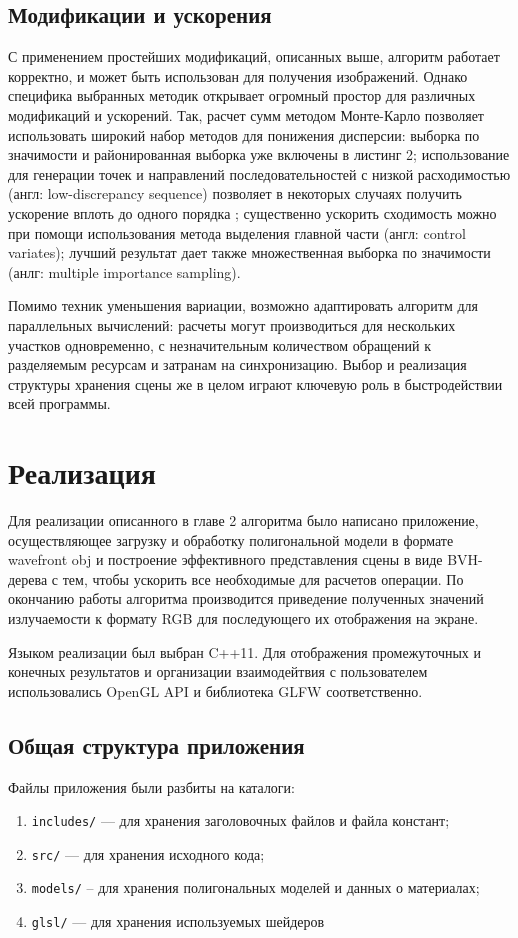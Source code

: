 \documentclass[12pt]{article}
\begin{document}
\subsection{Модификации и ускорения}
С применением простейших модификаций, описанных выше, алгоритм работает корректно, и может быть использован для получения изображений. Однако специфика выбранных методик открывает огромный простор для различных модификаций и ускорений. Так, расчет сумм методом Монте-Карло позволяет использовать широкий набор методов для понижения дисперсии: выборка по значимости и районированная выборка уже включены в листинг 2; использование для генерации точек и направлений последовательностей с низкой расходимостью (англ: low-discrepancy sequence) позволяет в некоторых случаях получить ускорение вплоть до одного порядка \cite{Kel96}; существенно ускорить сходимость можно при помощи использования метода выделения главной части (англ: control variates); лучший результат дает также множественная выборка по значимости (анлг: multiple importance sampling).

Помимо техник уменьшения вариации, возможно адаптировать алгоритм для параллельных вычислений: расчеты могут производиться  для нескольких участков одновременно, с незначительным количеством обращений к разделяемым ресурсам и затранам на синхронизацию. Выбор и реализация структуры хранения сцены же в целом играют ключевую роль в быстродействии всей программы. 
\newpage\section{Реализация}
Для реализации описанного в главе 2 алгоритма было написано приложение, осуществляющее загрузку и обработку полигональной модели в формате wavefront obj и построение эффективного представления сцены в виде BVH-дерева с тем, чтобы ускорить все необходимые для расчетов операции. По окончанию работы алгоритма производится приведение полученных значений излучаемости к формату RGB для последующего их отображения на экране.

Языком реализации был выбран C++11. Для отображения промежуточных и конечных результатов и организации взаимодейтвия с пользователем использовались OpenGL API и библиотека GLFW соответственно.
\subsection{Общая структура приложения}
Файлы приложения были разбиты на каталоги: 
\begin{enumerate}
\item[] \texttt{includes/} --- для хранения заголовочных файлов и файла констант;
\item[] \texttt{src/} --- для хранения исходного кода;
\item[] \texttt{models/} -- для хранения полигональных моделей и данных о материалах;
\item[] \texttt{glsl/} --- для хранения используемых шейдеров
\end{enumerate}
\end{document}
